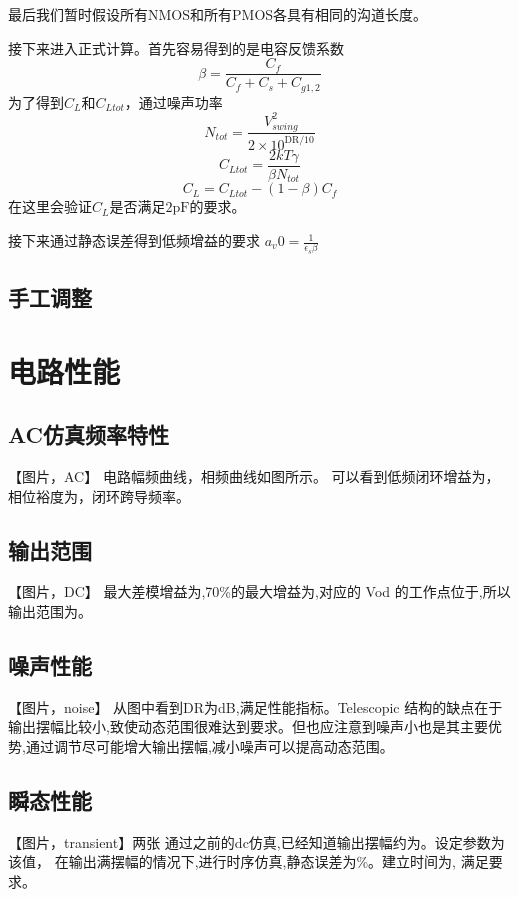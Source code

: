 \documentclass[a4paper]{article}
\newcommand{\upF}{\si{\pico\farad}}
\begin{document}
最后我们暂时假设所有NMOS和所有PMOS各具有相同的沟道长度。

接下来进入正式计算。首先容易得到的是电容反馈系数
$$\beta=\frac{C_f}{C_f+C_s+C_{g1,2}}$$
为了得到$C_L$和$C_{Ltot}$，通过噪声功率
$$N_{tot}=\frac{V_{swing}^2}{2\times10^{\mathrm{DR}/10}}$$
$$C_{Ltot}=\frac{2kT\gamma}{\beta N_{tot}}$$
$$C_L=C_{Ltot}-(1-\beta)C_f$$
在这里会验证$C_L$是否满足$2\upF$的要求。

接下来通过静态误差得到低频增益的要求
$a_v0=\frac{1}{\epsilon_s\beta}$




\subsection{手工调整}

\newpage

\section{电路性能}
\subsection{AC仿真频率特性}
【图片，AC】
电路幅频曲线，相频曲线如图所示。
可以看到低频闭环增益为，相位裕度为，闭环跨导频率。
\newpage
\subsection{输出范围}
【图片，DC】
最大差模增益为,70\%的最大增益为,对应的 Vod 的工作点位于,所以输出范围为。
\newpage
\subsection{噪声性能}
【图片，noise】
从图中看到DR为dB,满足性能指标。Telescopic 结构的缺点在于输出摆幅比较小,致使动态范围很难达到要求。但也应注意到噪声小也是其主要优势,通过调节尽可能增大输出摆幅,减小噪声可以提高动态范围。
\newpage
\subsection{瞬态性能}
【图片，transient】两张
通过之前的dc仿真,已经知道输出摆幅约为。设定参数为该值， 在输出满摆幅的情况下,进行时序仿真,静态误差为\%。建立时间为,
满足要求。
\newpage
\end{document}
